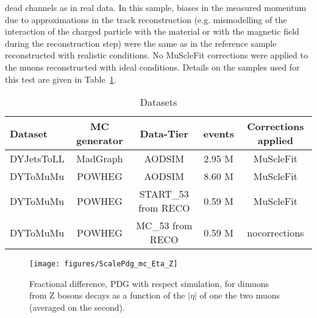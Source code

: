 dead channels as in real data.
In this sample, biases in the measured momentum due
to approximations in the track reconstruction (e.g. mismodelling
of the interaction of the charged particle
with the material or with the magnetic field during the reconstruction step) were the same as
in the reference sample reconstructed with realistic conditions. 
No MuScleFit corrections were applied to the muons reconstructed with ideal conditions.
Details on the samples used for this test are given in Table~\ref{tab:datasets_for_systematics}.
\begin{table}[hbH]
\begin{center}
\caption{Datasets \label{tab:datasets_for_systematics}} 
\begin{tabular}{|l|c|c|c|c|}
\hline
Dataset & MC generator & Data-Tier & events & Corrections applied\\
\hline 
DYJetsToLL & MadGraph &  AODSIM              & 2.95 M & MuScleFit \\
DYToMuMu   & POWHEG   &  AODSIM              & 8.60 M & MuScleFit \\
DYToMuMu   & POWHEG   &  START\_53 from RECO & 0.59 M & MuScleFit \\
DYToMuMu   & POWHEG   &  MC\_53 from RECO    & 0.59 M & nocorrections \\
\hline
\hline
\end{tabular}
\end{center}
\end{table}
\begin{figure}[hbtp]  
\begin{center}
\texttt{[image: figures/ScalePdg\_mc\_Eta\_Z]}
 \hspace{1cm} 
   \caption{Fractional difference, PDG with respect simulation,
     for dimuons from Z bosons decays as a function of the $|\eta|$
   of one the two muons (averaged on the second).} 
   \label{fig:syst_MC_PDG_eta} 
 \end{center}
\end{figure} 

